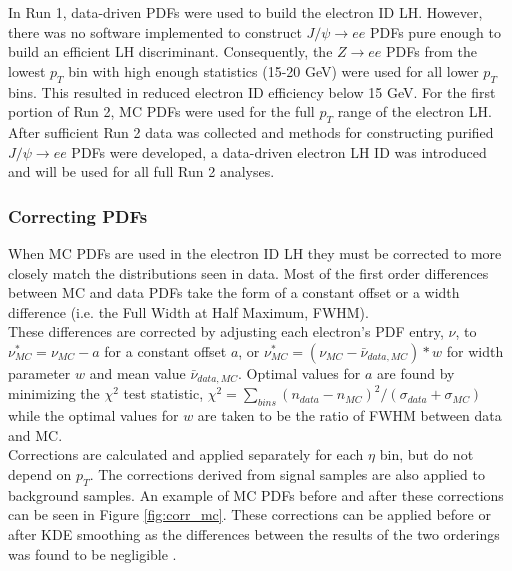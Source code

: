 \pagebreak 

In Run 1, data-driven PDFs were used to build the electron ID LH. However, there was no software implemented to construct $J/\psi\rightarrow ee$ PDFs pure enough to build an efficient LH discriminant. Consequently, the $Z\rightarrow ee$ PDFs from the lowest $p_T$ bin with high enough statistics (15-20 GeV) were used for all lower $p_T$ bins. This resulted in reduced electron ID efficiency below 15 GeV. For the first portion of Run 2, MC PDFs were used for the full $p_T$ range of the electron LH. After sufficient Run 2 data was collected and methods for constructing purified $J/\psi\rightarrow ee$ PDFs were developed, a data-driven electron LH ID was introduced and will be used for all full Run 2 analyses. 

\subsubsection{Correcting PDFs}\label{sec:corr_pdfs}
When MC PDFs are used in the electron ID LH they must be corrected to more closely match the distributions seen in data. Most of the first order differences between MC and data PDFs take the form of a constant offset or a width difference (i.e. the Full Width at Half Maximum, FWHM). \\

These differences are corrected by adjusting each electron's PDF entry, $\nu$, to $\nu^*_{MC}=\nu_{MC}-a$ for a constant offset $a$, or $\nu^*_{MC}=(\nu_{MC}-\bar{\nu}_{data,MC})*w$ for width parameter $w$ and mean value $\bar{\nu}_{data,MC}$. Optimal values for $a$ are found by minimizing the $\chi^2$ test statistic, $\chi^2=\sum_{bins}(n_{data}-n_{MC})^2/(\sigma_{data}+\sigma_{MC})$ while the optimal values for $w$ are taken to be the ratio of FWHM between data and MC.\\ 

Corrections are calculated and applied separately for each $\eta$ bin, but do not depend on $p_T$. The corrections derived from signal samples are also applied to background samples. An example of MC PDFs before and after these corrections can be seen in Figure \ref{fig:corr_mc}. These corrections can be applied before or after KDE smoothing as the differences between the results of the two orderings was found to be negligible \cite{id_note}.

